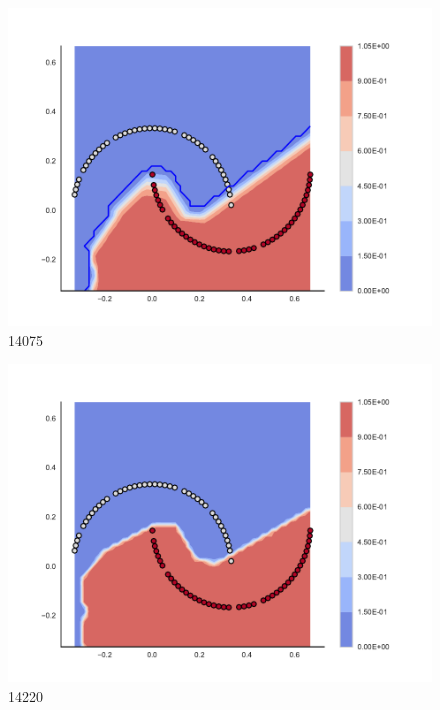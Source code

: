 \begin{subfigure}[b]{0.09\textwidth}
    \includegraphics[width=\textwidth]{img/convergence/14075.pdf}
    \caption{14075}
    \label{fig:convergence_14075}
\end{subfigure}
%
\begin{subfigure}[b]{0.09\textwidth}
    \includegraphics[width=\textwidth]{img/convergence/14220.pdf}
    \caption{14220}
    \label{fig:convergence_14220}
\end{subfigure}
%
